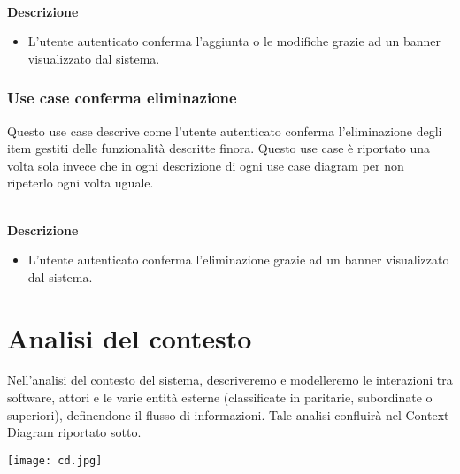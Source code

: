\documentclass[a4paper,12pt]{article}
\begin{document}
\textbf{\\Descrizione}
\begin{itemize} \setlength\itemsep{0.01em}
\item L'utente autenticato conferma l'aggiunta o le modifiche grazie ad un banner visualizzato dal sistema.
\end{itemize}




\subsubsection*{Use case conferma eliminazione}

 Questo use case descrive come l'utente autenticato conferma l'eliminazione degli item gestiti delle funzionalità descritte finora.
 Questo use case è riportato una volta sola invece che in ogni descrizione di ogni use case diagram per non ripeterlo ogni volta uguale. 
 
\textbf{\\Descrizione}
\begin{itemize} \setlength\itemsep{0.01em}
\item L'utente autenticato conferma l'eliminazione grazie ad un banner visualizzato dal sistema.
\end{itemize}




\newpage
\section*{Analisi del contesto}
Nell'analisi del contesto del sistema, descriveremo e modelleremo le interazioni tra software, attori e le varie entità esterne (classificate in paritarie, subordinate o superiori), definendone il flusso di informazioni. Tale analisi confluirà nel Context Diagram riportato sotto.

\begin{center}
  \texttt{[image: cd.jpg]}
\end{center}
\end{document}
